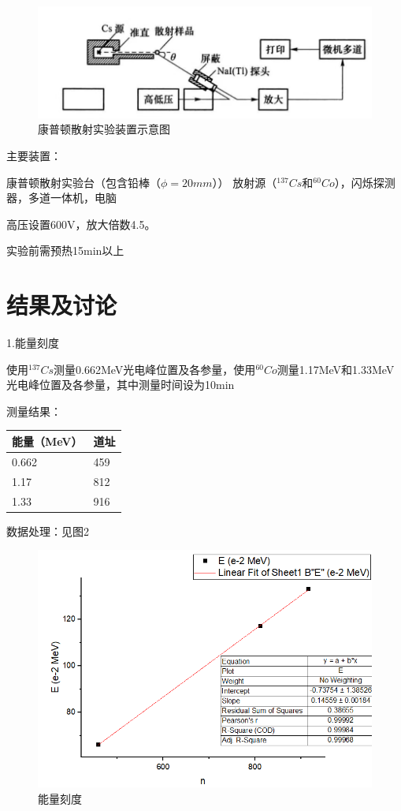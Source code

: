 \documentclass[font=default]{mpltx}
\begin{document}
\begin{figure}
  \centering
  \includegraphics[width=0.85\linewidth]{fig/instrument2.jpg}
  \caption{康普顿散射实验装置示意图}
  \label{sec:instrument2}
\end{figure}

主要装置：

康普顿散射实验台（包含铅棒（$\phi = 20 mm$））
放射源（$ ^{137}{Cs}$和$ ^{60}{Co}$），闪烁探测器，多道一体机，电脑

高压设置600V，放大倍数4.5。

实验前需预热15min以上

\section{结果及讨论}
1.能量刻度

使用$ ^{137}{Cs}$测量0.662MeV光电峰位置及各参量，使用$ ^{60}{Co}$测量1.17MeV和1.33MeV光电峰位置及各参量，其中测量时间设为10min

测量结果：

\begin{table}[!ht]
    \centering
    \begin{tabular}{|l|l|}
    \hline
能量（MeV）                & 道址                  \\  \hline
0.662                     & 459                    \\ \hline
1.17                      & 812                    \\ \hline
1.33                      & 916                     \\ \hline
    \end{tabular}
\end{table}

数据处理：见图2 

\begin{figure}
  \centering
  \includegraphics[width=0.85\linewidth]{fig/data2(1).png}
  \caption{能量刻度}
  \label{sec:data2(1)}
\end{figure}
\end{document}
